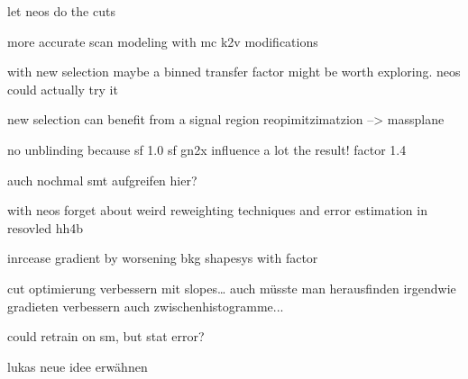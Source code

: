 let neos do the cuts 

more accurate scan modeling with mc k2v modifications 

with new selection maybe a binned transfer factor might be worth exploring.
neos could actually try it

new selection can benefit from a signal region reopimitzimatzion --> massplane


no unblinding because sf
1.0 sf gn2x influence a lot the result! factor 1.4 


auch nochmal smt aufgreifen hier?


with neos forget about weird reweighting techniques and error estimation in resovled hh4b

inrcease gradient by worsening bkg shapesys with factor

cut optimierung verbessern mit slopes… 
auch müsste man herausfinden 
irgendwie gradieten verbessern auch zwischenhistogramme...

could retrain on sm, but stat error?

lukas neue idee erwähnen

